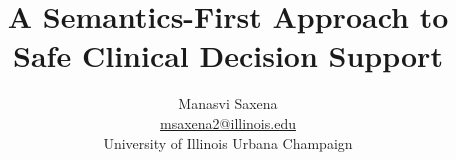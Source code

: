 


\title{A Semantics-First Approach to Safe Clinical Decision Support}
\author{Manasvi Saxena \\
\href{mailto:msaxena2@illinois.edu}{msaxena2@illinois.edu} \\
University of Illinois Urbana Champaign}

\date{}
\maketitle

%
% 


%




\newpage




